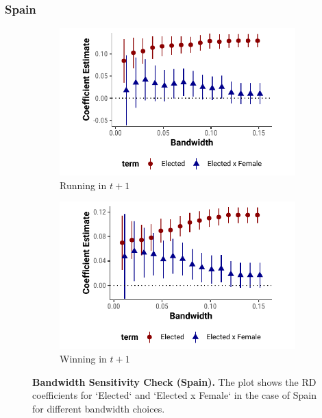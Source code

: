\documentclass[12pt]{article}
\begin{document}
\clearpage
\subsubsection{Spain}
\begin{figure}[!htb]
    \centering
    \begin{subfigure}[t]{0.48\textwidth}
    \includegraphics[width = 1 \textwidth]{../output/figures/spain_run_again_bw.pdf}
    \caption{Running in $t+1$}
    \end{subfigure}%
    \begin{subfigure}[t]{0.48\textwidth}
    \includegraphics[width = 1 \textwidth]{../output/figures/spain_win_again_bw.pdf}
    \caption{Winning in $t+1$}
    \end{subfigure}
    \caption{\textbf{Bandwidth Sensitivity Check (Spain).} The plot shows the RD coefficients for `Elected` and `Elected x Female` in the case of Spain for different bandwidth choices.}
    \label{fig:spain_bw_sens}
\end{figure}
\end{document}
